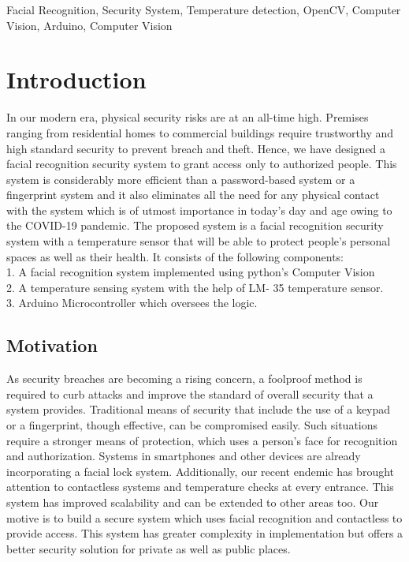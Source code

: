\documentclass[conference]{IEEEtran}
\begin{document}
	\begin{keywords}
		Facial Recognition, Security System, Temperature
		detection, OpenCV, Computer Vision, Arduino, Computer Vision
	\end{keywords}
	
	\IEEEpeerreviewmaketitle
	
	
	
	\section{Introduction}
	In our modern era, physical security risks are at an all-time high. Premises ranging from residential homes to commercial
	buildings require trustworthy and high standard security
	to prevent breach and theft. Hence, we have
	designed a facial recognition security system to grant
	access only to authorized people. This system is considerably more
	efficient than a password-based system or a fingerprint
	system and it also eliminates all the need for any physical contact with the system which is of utmost importance in today's day and age owing to the COVID-19 pandemic.
	The proposed system is a facial recognition security system with a temperature sensor that will be able to protect people’s
	personal spaces as well as their health. It consists of the
	following components: \\
	1. A facial recognition system implemented using python's Computer Vision \\
	2. A temperature sensing system with the help of LM-
	35 temperature sensor. \\
	3. Arduino Microcontroller which oversees the logic.
	
	
	
	\subsection{Motivation}
	As security breaches are becoming a rising concern, a foolproof method is required to curb attacks and improve the standard of overall security that a system provides. Traditional means of security that include the use of a keypad or a fingerprint, though effective, can be compromised easily. Such situations require a stronger means of protection, which uses a person’s face for recognition and authorization. Systems in smartphones and other devices are already incorporating a facial lock system. Additionally, our recent endemic has brought attention to contactless systems and temperature checks at every entrance. This system has improved scalability and can be extended to other areas too. Our motive is to build a secure system which uses facial recognition and contactless to provide access. This system has greater complexity in implementation but offers a better security solution for private as well as public places.
	
\end{document}
